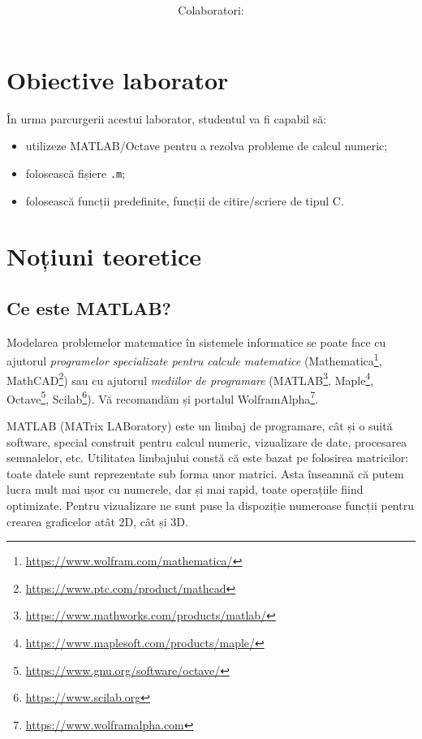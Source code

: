 \documentclass{exam}
\title{
\textmd{\textbf{\MNLabTitle}}
\author{Colaboratori: \MNAuthor}
}
\begin{document}
\begin{coverpages}

	\maketitle
	\thispagestyle{empty}
	\tableofcontents

\end{coverpages}

\section{Obiective laborator}

În urma parcurgerii acestui laborator, studentul va fi capabil să:
\begin{itemize}
	\item utilizeze MATLAB/Octave pentru a rezolva probleme de calcul numeric;
	\item folosească fișiere \verb|.m|;
	\item folosească funcții predefinite, funcții de citire/scriere de tipul C.
\end{itemize}

\section{Noțiuni teoretice}

\subsection{Ce este MATLAB?}

\par Modelarea problemelor matematice în sistemele informatice se poate face cu
ajutorul \textit{programelor specializate pentru calcule matematice}
(Mathematica\footnote{\url{https://www.wolfram.com/mathematica/}},
MathCAD\footnote{\url{https://www.ptc.com/product/mathcad}}) sau cu ajutorul
\textit{mediilor de programare} (MATLAB\footnote{\url{https://www.mathworks.com/products/matlab/}},
Maple\footnote{\url{https://www.maplesoft.com/products/maple/}},
Octave\footnote{\url{https://www.gnu.org/software/octave/}},
Scilab\footnote{\url{https://www.scilab.org}}).
Vă recomandăm și portalul WolframAlpha\footnote{\url{https://www.wolframalpha.com}}.

\par MATLAB (MATrix LABoratory) este un limbaj de programare, cât și o suită
software, special construit pentru calcul numeric, vizualizare de date,
procesarea semnalelor, etc.
Utilitatea limbajului constă că este bazat pe folosirea matricilor: toate datele sunt reprezentate sub forma unor matrici. Asta înseamnă că putem lucra mult mai ușor cu numerele, dar și mai rapid, toate operațiile fiind optimizate.
Pentru vizualizare ne sunt puse la dispoziție numeroase funcții pentru crearea graficelor atât 2D, cât și 3D.
\end{document}
